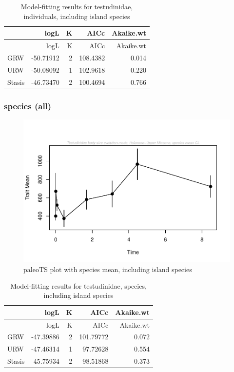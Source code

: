 \documentclass[]{article}
\begin{document}
\begin{longtable}[]{@{}lrrrr@{}}
\caption{Model-fitting results for testudinidae, individuals, including
island species}\tabularnewline
\toprule
& logL & K & AICc & Akaike.wt\tabularnewline
\midrule
\endfirsthead
\toprule
& logL & K & AICc & Akaike.wt\tabularnewline
\midrule
\endhead
GRW & -50.71912 & 2 & 108.4382 & 0.014\tabularnewline
URW & -50.08092 & 1 & 102.9618 & 0.220\tabularnewline
Stasis & -46.73470 & 2 & 100.4694 & 0.766\tabularnewline
\bottomrule
\end{longtable}

\newpage

\subsubsection{species (all)}\label{species-all}

\begin{figure}[htbp]
\centering
\includegraphics{MA_JJ_files/figure-latex/paleoTS plot with species mean, including island species-1.pdf}
\caption{paleoTS plot with species mean, including island species}
\end{figure}

\begin{longtable}[]{@{}lrrrr@{}}
\caption{Model-fitting results for testudinidae, species, including
island species}\tabularnewline
\toprule
& logL & K & AICc & Akaike.wt\tabularnewline
\midrule
\endfirsthead
\toprule
& logL & K & AICc & Akaike.wt\tabularnewline
\midrule
\endhead
GRW & -47.39886 & 2 & 101.79772 & 0.072\tabularnewline
URW & -47.46314 & 1 & 97.72628 & 0.554\tabularnewline
Stasis & -45.75934 & 2 & 98.51868 & 0.373\tabularnewline
\bottomrule
\end{longtable}
\end{document}

